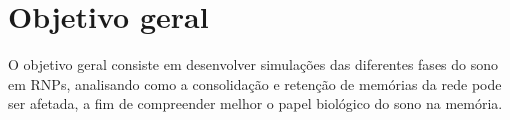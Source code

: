 \section{Objetivo geral}

O objetivo geral consiste em desenvolver simulações das diferentes fases do sono em RNPs, analisando como a consolidação e
retenção de memórias da rede pode ser afetada, a fim de compreender melhor o papel biológico do sono na memória.
